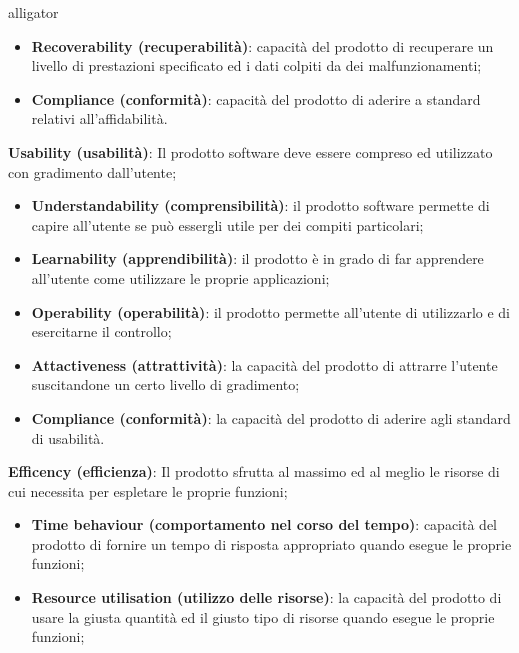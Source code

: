 \begin{labeling}{alligator}
\begin{itemize}
		\item \textbf{Recoverability (recuperabilità)}: capacità del prodotto di recuperare un livello di prestazioni specificato ed i dati colpiti da dei malfunzionamenti;
		
		\item \textbf{Compliance (conformità)}: capacità del prodotto di aderire a standard relativi all'affidabilità.
	\end{itemize}
	
	\item \textbf{Usability (usabilità)}: Il prodotto software deve essere compreso ed utilizzato con gradimento dall'utente;
	\begin{itemize}
		\item \textbf{Understandability (comprensibilità)}: il prodotto software permette di capire all'utente se può essergli utile per dei compiti particolari;
		
		\item \textbf{Learnability (apprendibilità)}: il prodotto è in grado di far apprendere all'utente come utilizzare le proprie applicazioni;
		
		\item \textbf{Operability (operabilità)}: il prodotto permette all'utente di utilizzarlo e di esercitarne il controllo;
		
		\item \textbf{Attactiveness (attrattività)}: la capacità del prodotto di attrarre l'utente suscitandone un certo livello di gradimento;
		
		\item \textbf{Compliance (conformità)}: la capacità del prodotto di aderire agli standard di usabilità.
	\end{itemize}
	
	\item \textbf{Efficency (efficienza)}: Il prodotto sfrutta al massimo ed al meglio le risorse di cui necessita per espletare le proprie funzioni;
	\begin{itemize}
		\item \textbf{Time behaviour (comportamento nel corso del tempo)}: capacità del prodotto di fornire un tempo di risposta appropriato quando esegue le proprie funzioni;
		
		\item \textbf{Resource utilisation (utilizzo delle risorse)}: la capacità del prodotto di usare la giusta quantità ed il giusto tipo di risorse quando esegue le proprie funzioni;
		

\end{itemize}
\end{labeling}
